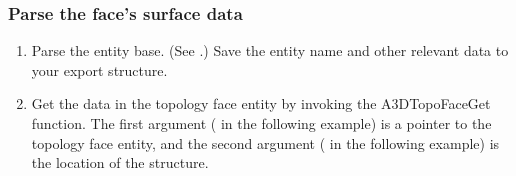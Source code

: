 \documentclass[letterpaper,12pt,english,openany,oneside]{sphinxmanual}
\begin{document}
\begin{sphinxVerbatim}[commandchars=\\\{\}]
 
\end{sphinxVerbatim}


\subsubsection{Parse the face’s surface data}
\label{\detokenize{Plugins_A3D_API:parse-the-face-s-surface-data}}\begin{enumerate}
%
\item {} 
Parse the entity base. (See .) Save the entity name and other relevant data to your export structure.

\item {} 
Get the data in the topology face entity by invoking the A3DTopoFaceGet function. The first argument ( in the following example) is a pointer to the topology face entity, and the second argument ( in the following example) is the location of the  structure.

\end{enumerate}
\end{document}
